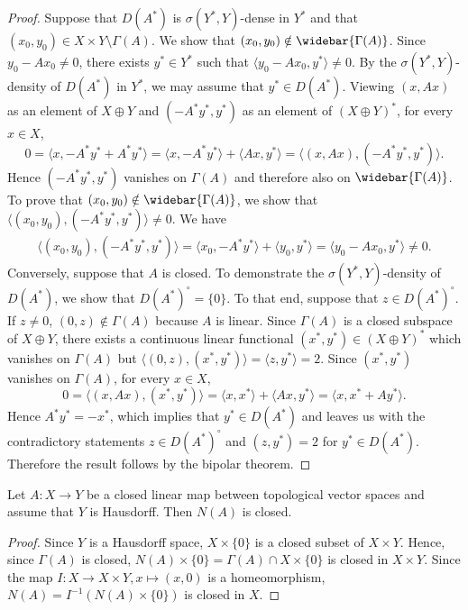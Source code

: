 \begin{proof}
Suppose that $D(A^*)$ is $\sigma(Y^*,Y)$-dense in $Y^*$ and that $(x_0,y_0)\in X\times Y\setminus\Gamma(A)$. We show that $(x_0,y_0)\notin\widebar{\Gamma(A)}$. Since $y_0-Ax_0\neq 0$, there exists $y^*\in Y^*$ such that $\langle y_0-Ax_0,y^*\rangle\neq 0$. By the $\sigma(Y^*,Y)$-density of $D(A^*)$ in $Y^*$, we may assume that $y^*\in D(A^*)$. Viewing $(x,Ax)$ as an element of $X\oplus Y$ and $(-A^*y^*,y^*)$ as an element of $(X\oplus Y)^*$, for every $x\in X$,
\[0=\langle x,-A^*y^*+A^*y^*\rangle=\langle x,-A^*y^*\rangle+\langle Ax,y^*\rangle=\langle(x,Ax),(-A^*y^*,y^*)\rangle.\]
Hence $(-A^*y^*,y^*)$ vanishes on $\Gamma(A)$ and therefore also on $\widebar{\Gamma(A)}$. To prove that $(x_0,y_0)\notin\widebar{\Gamma(A)}$, we show that $\langle(x_0,y_0),(-A^*y^*,y^*)\rangle\neq 0$. We have
\begin{align*}
\langle(x_0,y_0),(-A^*y^*,y^*)\rangle=\langle x_0,-A^*y^*\rangle+\langle y_0,y^*\rangle=\langle y_0-Ax_0,y^*\rangle\neq 0.
\end{align*}
Conversely, suppose that $A$ is closed. To demonstrate the $\sigma(Y^*,Y)$-density of $D(A^*)$, we show that $D(A^*)^\circ=\{0\}$. To that end, suppose that $z\in D(A^*)^\circ$. If $z\neq 0$, $(0,z)\notin\Gamma(A)$ because $A$ is linear. Since $\Gamma(A)$ is a closed subspace of $X\oplus Y$, there exists a continuous linear functional $(x^*,y^*)\in(X\oplus Y)^*$ which vanishes on $\Gamma(A)$ but $\langle(0,z),(x^*,y^*)\rangle=\langle z,y^*\rangle=2$. Since $(x^*,y^*)$ vanishes on $\Gamma(A)$, for every $x\in X$,
\[0=\langle(x,Ax),(x^*,y^*)\rangle=\langle x,x^*\rangle+\langle Ax,y^*\rangle=\langle x,x^*+Ay^*\rangle.\]
Hence $A^*y^*=-x^*$, which implies that $y^*\in D(A^*)$ and leaves us with the contradictory statements $z\in D(A^*)^\circ$ and $(z,y^*)=2$ for $y^*\in D(A^*)$. Therefore the result follows by the bipolar theorem.
\end{proof}
\begin{proposition}\label{closed linear map N(A) is closed}
Let $A:X\to Y$ be a closed linear map between topological vector spaces and assume that $Y$ is Hausdorff. Then $N(A)$ is closed.
\end{proposition}
\begin{proof}
Since $Y$ is a Hausdorff space, $X\times\{0\}$ is a closed subset of $X\times Y$. Hence, since $\Gamma(A)$ is closed, $N(A)\times\{0\}=\Gamma(A)\cap X\times\{0\}$ is closed in $X\times Y$. Since the map $I:X\to X\times Y,x\mapsto(x,0)$ is a homeomorphism, $N(A)=I^{-1}(N(A)\times\{0\})$ is closed in $X$.
\end{proof}
